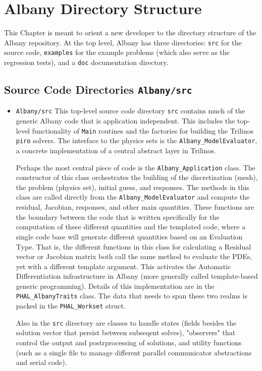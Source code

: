 \documentclass[pdf,12pt,report,strict]{SANDreport}
\theoremstyle{remark}
\begin{document}
\chapter{Albany Directory Structure}
\label{directories}

This Chapter is meant to orient a new developer to the directory structure of
the Albany repository.
At the top level, Albany has three directories: \texttt{src} for the source code,
\texttt{examples} for the example problems (which also serve as the regression tests),
and a \texttt{doc} documentation directory.

\section{Source Code Directories \texttt{Albany/src} }
\begin{itemize}

\item{\texttt{Albany/src}}  This top-level source code directory  \texttt{src} contains
much of the generic Albany code that is application independent. This includes the
top-level functionality of 
\texttt{Main} routines and the factories for building the Trilinos \texttt{piro} solvers.
The interface to the physics sets is the \texttt{Albany\_ModelEvaluator}, a concrete
implementation of a central abstract layer in Trilinos. 

Perhaps the most central piece of code is the \texttt{Albany\_Application} class.
The constructor of this class orchestrates the building of the discretization (mesh),
the problem (physics set), initial guess, and responses. The methods in this class
are called directly from the \texttt{Albany\_ModelEvaluator} and compute the residual,
Jacobian, responses, and other main quantities. These functions are the boundary between
the code that is written specifically for the computation of these different quantities
and the templated code, where a single code base will generate different quantities based
on an Evaluation Type. That is, the different functions in this class for calculating
a Residual vector or Jacobian matrix both call the same method to evaluate the PDEs, yet
with a different template argument. This activates the Automatic Differentiation 
infrastructure in Albany (more generally called template-based generic programming).
Details of this implementation are in the \texttt{PHAL\_AlbanyTraits} class. The data
that needs to span these two realms is packed in the \texttt{PHAL\_Workset} struct.

Also in the \texttt{src} directory are classes to handle states (fields besides the
solution vector that persist between subseqent solves), "observers" that control
the output and postrprocessing of solutions, and utility functions (such as a single
file to manage different parallel communicator abstractions and serial code).



\end{itemize}
\end{document}
